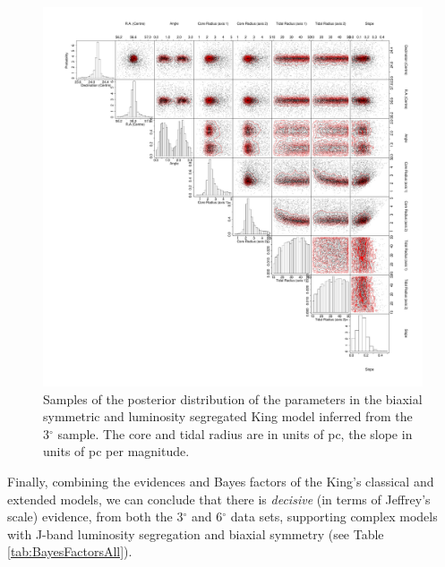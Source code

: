 \begin{figure}[ht!]
 \centering
  \includegraphics[width=\textwidth]{background/Figures/PSD/KingBS7.pdf}
  \caption{Samples of the posterior distribution of the parameters in the biaxial symmetric and luminosity segregated King model inferred from the 3$^{\circ}$ sample. The core and tidal radius are in units of pc, the slope in units of pc per magnitude.}
\label{fig:KingBS7}
\end {figure}

Finally, combining the evidences and Bayes factors of the King's classical and extended models, we can conclude that there is \emph{decisive} (in terms of Jeffrey's scale) evidence, from both the 3$^{\circ}$  and 6$^{\circ}$ data sets, supporting complex models with J-band luminosity segregation and biaxial symmetry (see Table \ref{tab:BayesFactorsAll}).

